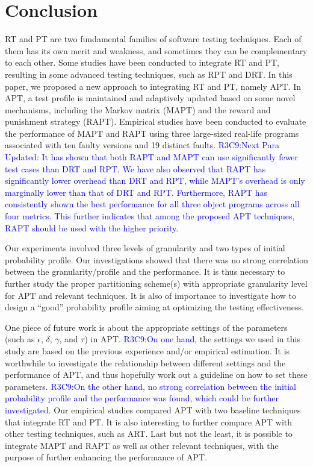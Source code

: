 \documentclass[10pt,journal,compsoc]{IEEEtran}
\begin{document}
\section{Conclusion}
\label{sec:conc}

RT and PT are two fundamental families of software testing techniques. Each of them has its own merit and weakness, and sometimes they can be complementary to each other. Some studies have been conducted to integrate RT and PT, resulting in some advanced testing techniques, such as RPT and DRT. In this paper, we proposed a new approach to integrating RT and PT, namely APT. In APT, a test profile is maintained and adaptively updated based on some novel mechanisms, including the Markov matrix (MAPT) and the reward and punishment strategy (RAPT). Empirical studies have been conducted to evaluate the performance of MAPT and RAPT using three large-sized real-life programs associated with ten faulty versions and 19 distinct faults.
\textcolor{blue}{R3C9:Next Para Updated: It has shown that both RAPT and MAPT can use significantly fewer test cases than DRT and RPT. We have also observed that RAPT has significantly lower overhead than DRT and RPT, while MAPT's overhead is only marginally lower than that of DRT and RPT.
Furthermore, RAPT has consistently shown the best performance for all three object programs across all four metrics. This further indicates that among the proposed APT techniques, RAPT should be used with the higher priority.}

Our experiments involved three levels of granularity and two types of initial probability profile. Our investigations showed that there was no strong correlation between the granularity/profile and the performance. It is thus necessary to further study the proper partitioning scheme(s) with appropriate granularity level for APT and relevant techniques. It is also of importance to investigate how to design a ``good'' probability profile aiming at optimizing the testing effectiveness.


One piece of future work is about the appropriate settings of the parameters (such as $\epsilon$, $\delta$, $\gamma$, and $\tau$) in APT.
\textcolor{blue}{R3C9:On one hand}, the settings we used in this study are based on the previous experience and/or empirical estimation. It is worthwhile to investigate the relationship between different settings and the performance of APT, and thus hopefully work out a guideline on how to set these parameters. \textcolor{blue}{R3C9:On the other hand, no strong correlation between the initial probability profile and the performance was found, which could be further investigated.} Our empirical studies compared APT with two baseline techniques that integrate RT and PT. It is also interesting to further compare APT with other testing techniques, such as ART. Last but not the least, it is possible to integrate MAPT and RAPT as well as other relevant techniques, with the purpose of further enhancing the performance of APT.
\end{document}
